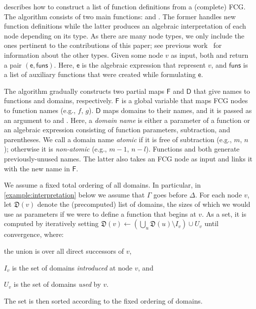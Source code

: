 \documentclass{article}
\theoremstyle{definition}
\theoremstyle{remark}
\begin{document}
 describes how to construct a list of function
definitions from a (complete) FCG\@. The algorithm consists of two main
functions: \visit and \actuallyVisit. The former handles new function
definitions while the latter produces an algebraic interpretation of each node
depending on its type. As there are many node types, we only include the ones
pertinent to the contributions of this paper; see previous
work~\cite{DBLP:conf/ijcai/BroeckTMDR11} for information about the other types.
Given some node $v$ as input, both \visit and \actuallyVisit return a pair
$(\mathsf{e}, \mathsf{funs})$. Here, $\mathsf{e}$ is the algebraic expression
that represent $v$, and $\mathsf{funs}$ is a list of auxiliary functions that
were created while formulating $\mathsf{e}$.

The algorithm gradually constructs two partial maps $\mathsf{F}$ and
$\mathsf{D}$ that give names to functions and domains, respectively.
$\mathsf{F}$ is a global variable that maps FCG nodes to function names (e.g.,
$f$, $g$). $\mathsf{D}$ maps domains to their names, and it is passed as an
argument to \visit and \actuallyVisit. Here, a \emph{domain name} is either a
parameter of a function or an algebraic expression consisting of function
parameters, subtraction, and parentheses. We call a domain name \emph{atomic} if
it is free of subtraction (e.g., $m$, $n$); otherwise it is \emph{non-atomic}
(e.g., $m-1$, $n-l$). Functions \newDomainName and \newFunctionName both
generate previously-unused names. The latter also takes an FCG node as input and
links it with the new name in $\mathsf{F}$.

We assume a fixed total ordering of all domains. In particular, in
\cref{example:interpretation} below we assume that $\Gamma$ goes before
$\Delta$. For each node $v$, let $\mathfrak{D}(v)$ denote the (precomputed) list
of domains, the sizes of which we would use as parameters if we were to define a
function that begins at $v$. As a set, it is computed by iteratively setting
$\mathfrak{D}(v) \gets \left(\bigcup_{u} \mathfrak{D}(u) \setminus I_{v}\right) \cup U_{v}$
until convergence, where:
\begin{enumerate*}[label=(\roman*)]
  \item the union is over all direct successors of $v$,
  \item $I_{v}$ is the set of domains \emph{introduced} at node $v$, and
  \item $U_{v}$ is the set of domains \emph{used} by $v$.
\end{enumerate*}
The set is then sorted according to the fixed ordering of domains.
\end{document}
